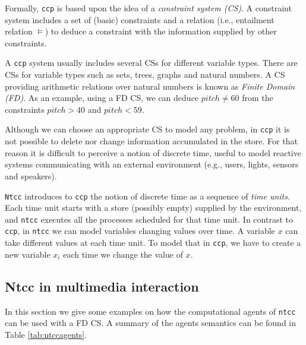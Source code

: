 \documentclass[english]{llncs}
\begin{document}
Formally, \texttt{ccp} is based upon the idea of a \textit{constraint system (CS)}. A constraint system includes a set of (basic) constraints and a relation (i.e., entailment relation $\models$) to deduce a constraint with the information supplied by other constraints.

A \texttt{ccp} system usually includes several CSs for different variable types. 
 There are CSs for variable types such as sets, trees, graphs and natural numbers. A CS providing arithmetic relations over natural numbers is known as \textit{Finite Domain (FD)}. As an example, using a FD CS, we can deduce $pitch \neq 60$ from the constraints $pitch > 40$ and $pitch < 59$. 


Although we can choose an appropriate CS to model any problem, 
in \texttt{ccp} it is not possible to delete nor change information accumulated in the store. For that reason it is difficult to perceive a notion of discrete time, useful to model reactive systems communicating with an external environment (e.g., users, lights, sensors and speakers).


\texttt{Ntcc} introduces to \texttt{ccp} the notion of discrete time as a sequence of \textit{time units}. Each time unit starts with a store  (possibly empty) supplied by the environment, and \texttt{ntcc} executes all the processes scheduled for that time unit.
In contrast to \texttt{ccp}, in \texttt{ntcc} we can model variables changing values over time. A variable $x$ can take different values at each time unit. To model that
in \texttt{ccp}, we have to create a new variable $x_i$ each time we change the value of $x$.




\subsection{Ntcc in multimedia interaction}

In this section we give some examples on how the computational agents of \texttt{ntcc} can be used with a FD CS.
A summary of the agents semantics can be found in Table \ref{tab:ntccagents}.
\end{document}
